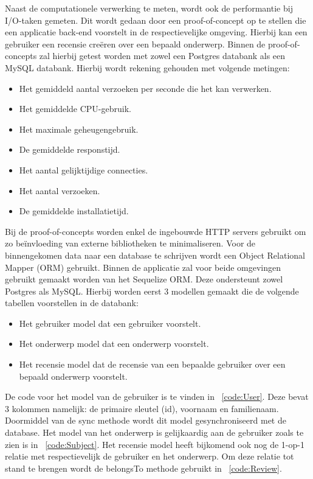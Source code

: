 Naast de computationele verwerking te meten, wordt ook de performantie bij I/O-taken gemeten.
Dit wordt gedaan door een proof-of-concept op te stellen die een applicatie back-end voorstelt in de respectievelijke omgeving.
Hierbij kan een gebruiker een recensie creëren over een bepaald onderwerp. 
Binnen de proof-of-concepts zal hierbij getest worden met zowel een Postgres databank als een MySQL databank.
Hierbij wordt rekening gehouden met volgende metingen:
\begin{itemize}
    \item Het gemiddeld aantal verzoeken per seconde die het kan verwerken.
    \item Het gemiddelde CPU-gebruik.
    \item Het maximale geheugengebruik.
    \item De gemiddelde responstijd.
    \item Het aantal gelijktijdige connecties.
    \item Het aantal verzoeken.
    \item De gemiddelde installatietijd.
\end{itemize}
Bij de proof-of-concepts worden enkel de ingebouwde HTTP servers gebruikt om zo beïnvloeding van externe bibliotheken te minimaliseren.
Voor de binnengekomen data naar een database te schrijven wordt een Object Relational Mapper (ORM) gebruikt.
Binnen de applicatie zal voor beide omgevingen gebruikt gemaakt worden van het Sequelize ORM. Deze ondersteunt zowel Postgres als MySQL.
Hierbij worden eerst 3 modellen gemaakt die de volgende tabellen voorstellen in de databank:
\begin{itemize}
  \item Het gebruiker model dat een gebruiker voorstelt.
  \item Het onderwerp model dat een onderwerp voorstelt.
  \item Het recensie model dat de recensie van een bepaalde gebruiker over een bepaald onderwerp voorstelt.
\end{itemize}
De code voor het model van de gebruiker is te vinden in ~\ref{code:User}. Deze bevat 3 kolommen namelijk: de primaire sleutel (id), voornaam en familienaam.
Doormiddel van de sync methode wordt dit model gesynchroniseerd met de database. 
Het model van het onderwerp is gelijkaardig aan de gebruiker zoals te zien is in ~\ref{code:Subject}. Het recensie model heeft bijkomend 
ook nog de 1-op-1 relatie met respectievelijk de gebruiker en het onderwerp.
Om deze relatie tot stand te brengen wordt de belongsTo methode gebruikt in ~\ref{code:Review}. 
